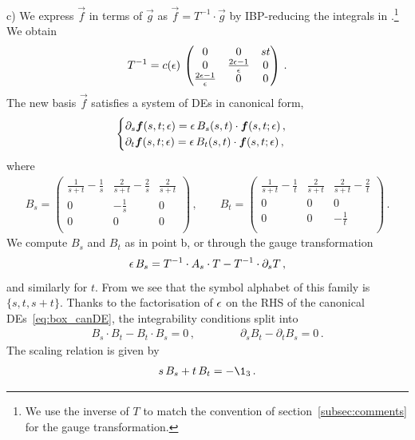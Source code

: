 \smallskip
\noindent
c) We express $\vec{f}$ in terms of $\vec{g}$ as $\vec{f} = T^{-1} \cdot \vec{g}$ by IBP-reducing the integrals in .\footnote{We use the inverse of $T$ to match the convention of section~\ref{subsec:comments} for the gauge transformation.} We obtain 
\begin{align}
T^{-1} = c(\epsilon) \, \begin{pmatrix}
  0 & 0 & s t \\
  0 & \frac{2\epsilon-1}{\epsilon} & 0 \\
  \frac{2\epsilon-1}{\epsilon} & 0 & 0 \\
\end{pmatrix} \,.
\end{align}
The new basis $\vec{f}$ satisfies a system of DEs in canonical form,
\begin{align} \label{eq:box_canDE}
\begin{cases}
\partial_s \vec{f}(s,t;\eps)  = \eps \, B_s(s,t)  \cdot   \vec{f}(s,t;\eps) \,, \\
\partial_t \vec{f}(s,t;\eps)  = \eps \, B_t(s,t)  \cdot   \vec{f}(s,t;\eps) \,, \\
\end{cases}
\end{align}
where
\begin{align} \label{eq:boxBmatrices}
B_s = \begin{pmatrix}
\frac{1}{s + t}-\frac{1}{s} & \frac{2}{s + t}-\frac{2}{s} & \frac{2}{s + t} \\
0 & - \frac{1}{s} & 0 \\
0 & 0 & 0 \\
\end{pmatrix} \,, \qquad
B_t = \begin{pmatrix}
\frac{1}{s + t}-\frac{1}{t} & \frac{2}{s + t} & \frac{2}{s + t}-\frac{2}{t} \\
0 & 0 & 0 \\
0 & 0 & -\frac{1}{t} \\
\end{pmatrix} \,.
\end{align}
We compute $B_s$ and $B_t$ as in point b, or through the gauge transformation
\begin{align}
\epsilon \, B_s = T^{-1} \cdot A_s \cdot T -  T^{-1} \cdot  \partial_s T \,,
\end{align}
and similarly for $t$. From  we see that the symbol alphabet of this family is $\{s, t, s+t\}$.
Thanks to the factorisation of $\epsilon$ on the RHS of the canonical DEs~\eqref{eq:box_canDE}, the integrability conditions split into
\begin{align}
B_s \cdot B_t - B_t \cdot B_s = 0 \,, \qquad \qquad \partial_s B_t - \partial_t B_s = 0 \,.
\end{align}
The scaling relation is given by
\begin{align}
s \, B_s + t \, B_t = -  \1_{3} \,.
\end{align}


